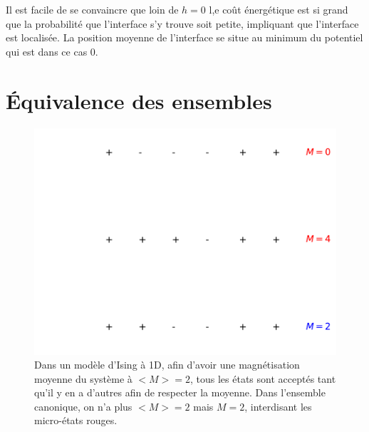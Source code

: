 Il est facile de se convaincre que loin de $h=0$ l,e coût énergétique est si grand que la probabilité que l'interface s'y trouve soit petite, impliquant que l'interface est localisée. La position moyenne de l'interface se situe au minimum du potentiel qui est dans ce cas $0$. 

	\section{Équivalence des ensembles}

\begin{figure}[h]
	\centering
	\includegraphics[scale=1]{isingtosos/figure-canonique.pdf}
	\caption{Dans un modèle d'Ising à 1D, afin d'avoir une magnétisation moyenne du système à $<M>=2$, tous les états sont acceptés tant qu'il y en a d'autres afin de respecter la moyenne. Dans l'ensemble canonique, on n'a plus $<M>=2$ mais $M=2$, interdisant les micro-états rouges.}
\end{figure}

